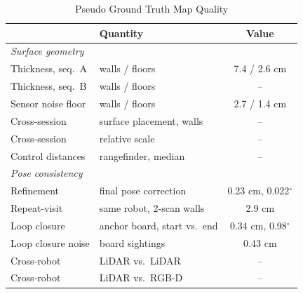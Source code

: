 \begin{table}[!t]
\centering
\caption{Pseudo Ground Truth Map Quality}
\label{tab:gt}
\begin{tabular}{llc}
\toprule
& Quantity & Value \\
\midrule
\multicolumn{3}{l}{\emph{Surface geometry}} \\
\quad Thickness, seq.\ A & walls / floors & 7.4 / 2.6 cm \\
\quad Thickness, seq.\ B & walls / floors & -- \\
\quad Sensor noise floor & walls / floors & 2.7 / 1.4 cm \\
\quad Cross-session      & surface placement, walls & -- \\
\quad Cross-session      & relative scale & -- \\
\quad Control distances  & rangefinder, median & -- \\
\midrule
\multicolumn{3}{l}{\emph{Pose consistency}} \\
\quad Refinement         & final pose correction & 0.23 cm, 0.022$^\circ$ \\
\quad Repeat-visit       & same robot, 2-scan walls & 2.9 cm \\
\quad Loop closure       & anchor board, start vs.\ end & 0.34 cm, 0.98$^\circ$ \\
\quad Loop closure noise & board sightings & 0.43 cm \\
\quad Cross-robot        & LiDAR vs.\ LiDAR & -- \\
\quad Cross-robot        & LiDAR vs.\ RGB-D & -- \\
\bottomrule
\end{tabular}
\end{table}
